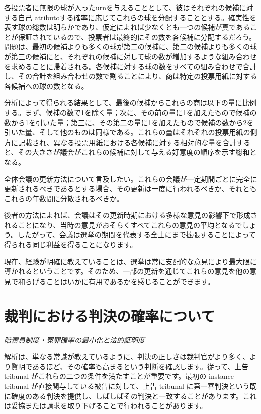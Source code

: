 \documentclass[a4paper,11pt,openany]{ltjsbook}
\begin{document}
各投票者に無限の球が入ったurnを与えることとして、彼はそれぞれの候補に対する自己 atributoする確率に応じてこれらの球を分配することとする。確実性を表す球の総数は明らかであり、仮定によれば少なくとも一つの候補が真であることが保証されているので、投票者は最終的にその数を各候補に分配するだろう。問題は、最初の候補よりも多くの球が第二の候補に、第二の候補よりも多くの球が第三の候補にと、それぞれの候補に対して球の数が増加するような組み合わせを求めることに帰着される。各候補に対する球の数をすべての組み合わせで合計し、その合計を組み合わせの数で割ることにより、商は特定の投票用紙に対する各候補への球の数となる。

分析によって得られる結果として、最後の候補からこれらの商は以下の量に比例する。まず、候補の数で1を除く量；次に、その前の量に1を加えたもので候補の数から1を引いた量；第三に、その第二の量に1を加えたもので候補の数から2を引いた量、そして他のものは同様である。これらの量はそれぞれの投票用紙の側方に記載され、異なる投票用紙における各候補に対する相対的な量を合計すると、その大きさが議会がこれらの候補に対して与える好意度の順序を示す総和となる。

全体会議の更新方法について言及したい。これらの会議が一定期間ごとに完全に更新されるべきであるとする場合、その更新は一度に行われるべきか、それともこれらの年数間に分散されるべきか。

後者の方法によれば、会議はその更新時期における多様な意見の影響下で形成されることになり、当時の意見がおそらくすべてこれらの意見の平均となるでしょう。したがって、会議は選挙の期間を代表する全土にまで拡張することによって得られる同じ利益を得ることになります。

現在、経験が明確に教えていることは、選挙は常に支配的な意見により最大限に導かれるということです。そのため、一部の更新を通じてこれらの意見を他の意見で和らげることはいかに有用であるかを感じることができます。

\newpage

\chapter{裁判における判決の確率について}
\label{ch:xiii}

\begin{center}
\large\textit{陪審員制度・冤罪確率の最小化と法的証明度}
\end{center}
\vspace{4mm}

解析は、単なる常識が教えているように、判決の正しさは裁判官がより多く、より賢明であるほど、その確率も高まるという判断を確認します。従って、上告 tribunal がこれらの二つの条件を満たすことが重要です。最初の instance tribunal が直接関与している被告に対して、上告 tribunal に第一審判決という既に確度のある判決を提供し、しばしばその判決と一致することがあります。これは妥協または請求を取り下げることで行われることがあります。
\end{document}
